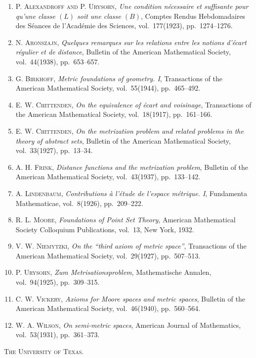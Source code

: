\documentclass[11pt,a4paper,leqno,twoside]{article}
\begin{document}
\begin{enumerate}[leftmargin=2em,label=\arabic*.,itemsep=3pt]
\item \textsc{P. Alexandroff and P. Urysohn}, \textit{Une condition nécessaire et suffisante pour qu'une classe $(L)$ soit une classe $(B)$}, Comptes Rendus Hebdomadaires des Séances de l'Académie des Sciences, vol.\ 177(1923), pp.\ 1274--1276.
\item \textsc{N. Aronszajn}, \textit{Quelques remarques sur les relations entre les notions d'écart régulier et de distance}, Bulletin of the American Mathematical Society, vol.\ 44(1938), pp.\ 653--657.
\item \textsc{G. Birkhoff}, \textit{Metric foundations of geometry. I}, Transactions of the American Mathematical Society, vol.\ 55(1944), pp.\ 465--492.
\item \textsc{E. W. Chittenden}, \textit{On the equivalence of écart and voisinage}, Transactions of the American Mathematical Society, vol.\ 18(1917), pp.\ 161--166.
\item \textsc{E. W. Chittenden}, \textit{On the metrization problem and related problems in the theory of abstract sets}, Bulletin of the American Mathematical Society, vol.\ 33(1927), pp.\ 13--34.
\item \textsc{A. H. Frink}, \textit{Distance functions and the metrization problem}, Bulletin of the American Mathematical Society, vol.\ 43(1937), pp.\ 133--142.
\item \textsc{A. Lindenbaum}, \textit{Contributions à l'étude de l'espace métrique. I}, Fundamenta Mathematicae, vol.\ 8(1926), pp.\ 209--222.
\item \textsc{R. L. Moore}, \textit{Foundations of Point Set Theory}, American Mathematical Society Colloquium Publications, vol.\ 13, New York, 1932.
\item \textsc{V. W. Niemytzki}, \textit{On the ``third axiom of metric space''}, Transactions of the American Mathematical Society, vol.\ 29(1927), pp.\ 507--513.
\item \textsc{P. Urysohn}, \textit{Zum Metrisationsproblem}, Mathematische Annalen, vol.\ 94(1925), pp.\ 309--315.
\item \textsc{C. W. Vickery}, \textit{Axioms for Moore spaces and metric spaces}, Bulletin of the American Mathematical Society, vol.\ 46(1940), pp.\ 560--564.
\item \textsc{W. A. Wilson}, \textit{On semi-metric spaces}, American Journal of Mathematics, vol.\ 53(1931), pp.\ 361--373.
\end{enumerate}
\bigskip\textsc{The University of Texas.}
\end{document}

